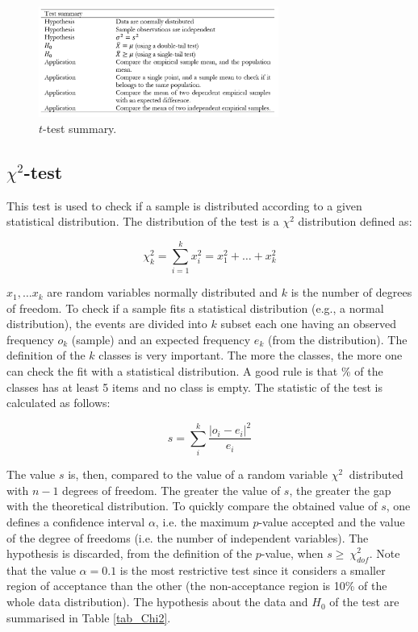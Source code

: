 \begin{figure}[hbt!]
\centering
\includegraphics[width=0.7\textwidth]{SectionLetsMath/elemStat_figures/tab_tTest.png}
\captionsetup{type=table}
\caption{$t$-test summary.}
\label{tab_tTest}
\end{figure}

\subsection{$\chi^{2}$-test}
This test is used to check if a sample is distributed according to a given statistical distribution. The distribution of the test is a $\chi^2$ distribution defined as:

\begin{equation}
\chi_k^2=\sum_{i=1}^{k}{x_i^2=x_1^2+\ldots+x_k^2}
\label{eq_chi2Distribution}
\end{equation}

$x_1,\ldots x_k$ are random variables normally distributed and $k$ is the number of degrees of freedom. To check if a sample fits a statistical distribution (e.g., a normal distribution), the events are divided into $k$ subset each one having an observed frequency $o_k$ (sample) and an expected frequency $e_k$ (from the distribution). The definition of the $k$ classes is very important. The more the classes, the more one can check the fit with a statistical distribution. A good rule is that \% of the classes has at least 5 items and no class is empty. The statistic of the test is calculated as follows:

\begin{equation}
s=\sum_{i}^{k}\frac{\left|o_i-e_i\right|^2}{e_i}
\label{eq_chi2test}
\end{equation}

The value $s$ is, then, compared to the value of a random variable $\chi^2\ $ distributed with $n-1$ degrees of freedom. The greater the value of $s$, the greater the gap with the theoretical distribution. To quickly compare the obtained value of $s$, one defines a confidence interval $\alpha$, i.e. the maximum $p$-value accepted and the value of the degree of freedoms (i.e. the number of independent variables). The hypothesis is discarded, from the definition of the $p$-value, when ${s\geq\ \chi}_{dof}^2$. Note that the value $\alpha=0.1$ is the most restrictive test since it considers a smaller region of acceptance than the other (the non-acceptance region is 10\% of the whole data distribution). The hypothesis about the data and $H_0$ of the test are summarised in Table \ref{tab_Chi2}.


